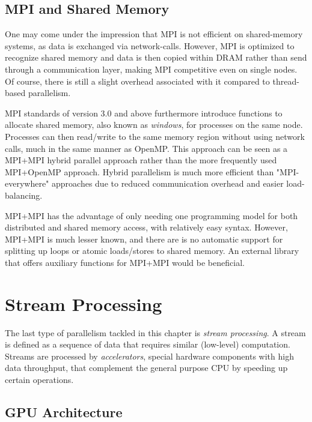 
\subsection{MPI and Shared Memory}

One may come under the impression that MPI is not efficient on shared-memory systems, as data is exchanged via network-calls. However, MPI is optimized to recognize shared memory and data is then copied within DRAM rather than send through a communication layer, making MPI competitive even on single nodes. Of course, there is still a slight overhead associated with it compared to thread-based parallelism.

MPI standards of version 3.0 and above furthermore introduce functions to allocate shared memory, also known as \emph{windows}, for processes on the same node. Processes can then read/write to the same memory region without using network calls, much in the same manner as OpenMP. This approach can be seen as a MPI+MPI hybrid parallel approach rather than the more frequently used MPI+OpenMP approach. Hybrid parallelism is much more efficient than "MPI-everywhere" approaches due to reduced communication overhead and easier load-balancing. 

MPI+MPI has the advantage of only needing one programming model for both distributed and shared memory access, with relatively easy syntax. However, MPI+MPI is much lesser known, and there are is no automatic support for splitting up loops or atomic loads/stores to shared memory. An external library that offers auxiliary functions for MPI+MPI would be beneficial.

\section{Stream Processing}

The last type of parallelism tackled in this chapter is \emph{stream processing}. A stream is defined as a sequence of data that requires similar (low-level) computation. Streams are processed by \emph{accelerators}, special hardware components with high data throughput, that complement the general purpose CPU by speeding up certain operations. 

\subsection{GPU Architecture}

